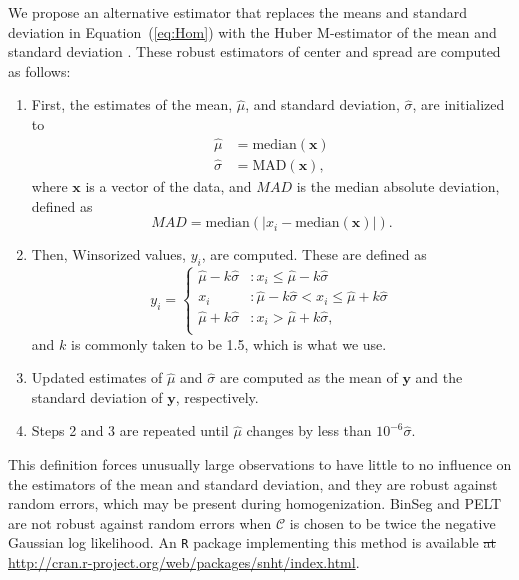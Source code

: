 \documentclass[12pt]{article}
\def\ni{\noindent}
\providecommand{\DIFaddtex}[1]{{\protect\color{blue}\uwave{#1}}} %
\providecommand{\DIFdeltex}[1]{{\protect\color{red}\sout{#1}}}                      %
\providecommand{\DIFaddbegin}{} %
\providecommand{\DIFaddend}{} %
\providecommand{\DIFdelbegin}{} %
\providecommand{\DIFdelend}{} %
\providecommand{\DIFadd}[1]{\texorpdfstring{\DIFaddtex{#1}}{#1}} %
\providecommand{\DIFdel}[1]{\texorpdfstring{\DIFdeltex{#1}}{}} %
\begin{document}
\begin{doublespacing}
We propose an alternative estimator that replaces the means and standard deviation in Equation~(\ref{eq:Hom}) with the Huber M-estimator of the mean and standard deviation \cite{huber11}.  These robust estimators of center and spread are computed as follows:
\begin{enumerate}
	\item First, the estimates of the mean, $\hat{\mu}$, and standard deviation, $\hat{\sigma}$, are initialized to
	\begin{align*}
		\hat{\mu} &= \mbox{median}(\mathbf{x})\\
		\hat{\sigma} &= \mbox{MAD}(\mathbf{x}),
	\end{align*}
	where $\mathbf{x}$ is a vector of the data, and $MAD$ is the median absolute deviation, defined as
	\begin{equation*}
		MAD = \mbox{median}( \lvert x_i - \mbox{median}(\mathbf{x}) \rvert ).
	\end{equation*}
	\item Then, Winsorized values, $y_i$, are computed.  These are defined as
	\begin{equation*}
		y_i = \left\{ \begin{array}{ll}
			\hat{\mu}-k \hat{\sigma} & : x_i \leq \hat{\mu}-k \hat{\sigma}\\
			x_i & : \hat{\mu}-k \hat{\sigma} < x_i \leq \hat{\mu}+k \hat{\sigma}\\
			\hat{\mu}+k \hat{\sigma} & : x_i > \hat{\mu}+k \hat{\sigma},\\
		\end{array} \right.
	\end{equation*}
	and $k$ is commonly taken to be 1.5, which is what we use.
	\item Updated estimates of $\hat{\mu}$ and $\hat{\sigma}$ are computed as the mean of $\mathbf{y}$ and the standard deviation of $\mathbf{y}$, respectively.
	\item Steps 2 and 3 are repeated until $\hat{\mu}$ changes by less than $10^{-6} \hat{\sigma}$.
\end{enumerate}

\ni This definition forces unusually large observations to have little to no influence on the estimators of the mean and standard deviation, and they are robust against random errors, which may be present during homogenization.  BinSeg and PELT are not robust against random errors when $\mathcal{C}$ is chosen to be twice the negative Gaussian log likelihood.  An \texttt{R} package implementing this method is available \DIFdelbegin \DIFdel{at }%
\DIFdelend \DIFaddbegin \DIFadd{on CRAN at }\url{http://cran.r-project.org/web/packages/snht/index.html}\DIFaddend .


\end{doublespacing}
\end{document}
